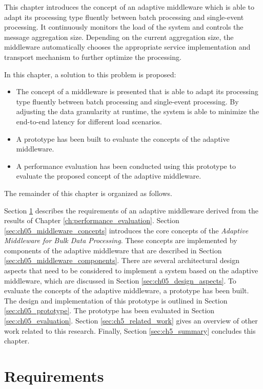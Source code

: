 This chapter introduces the concept of an adaptive middleware which is able to adapt its processing type fluently between batch processing and single-event processing. It continuously monitors the load of the system and controls the message aggregation size. Depending on the current aggregation size, the middleware automatically chooses the appropriate service implementation and transport mechanism to further optimize the processing.

In this chapter, a solution to this problem is proposed:

\begin{itemize}
	\item The concept of a middleware is presented that is able to adapt its processing type fluently between batch processing and single-event processing. By adjusting the data granularity at runtime, the system is able to minimize the end-to-end latency for different load scenarios.
	\item A prototype has been built to evaluate the concepts of the adaptive middleware.
	\item A performance evaluation has been conducted using this prototype to evaluate the proposed concept of the adaptive middleware.
\end{itemize}

The remainder of this chapter is organized as follows. 

Section \ref{sec:ch04_requirements} describes the requirements of an adaptive middleware derived from the results of Chapter \ref{ch:performance_evaluation}. Section \ref{sec:ch05_middleware_concepts} introduces the core concepts of the \emph{Adaptive Middleware for Bulk Data Processing}. These concepts are implemented by components of the adaptive middleware that are described in Section \ref{sec:ch05_middleware_components}. There are several architectural design aspects that need to be considered to implement a system based on the adaptive middleware, which are discussed in Section \ref{sec:ch05_design_aspects}. To evaluate the concepts of the adaptive middleware, a prototype has been built. The design and implementation of this prototype is outlined in Section \ref{sec:ch05_prototype}. The prototype has been evaluated in Section \ref{sec:ch05_evaluation}. Section \ref{sec:ch5_related_work} gives an overview of other work related to this research. Finally, Section \ref{sec:ch5_summary} concludes this chapter.

\section{Requirements}
\label{sec:ch04_requirements}

